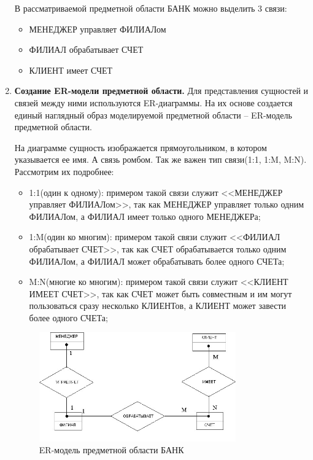 \begin{enumerate}
	В рассматриваемой предметной области БАНК можно выделить 3 связи:
	\begin{itemize}
		
		\item МЕНЕДЖЕР управляет ФИЛИАЛом
		
		\item ФИЛИАЛ обрабатывает СЧЕТ
		
		\item КЛИЕНТ имеет СЧЕТ
		
	\end{itemize}
	
	\item \textbf{Создание ER-модели предметной области.}
	Для представления сущностей и связей между ними используются ER-диаграммы. На их основе создается единый
	наглядный образ моделируемой предметной области – ER-модель предметной области.
	
	На диаграмме сущность изображается прямоугольником, в
	котором указывается ее имя. А связь ромбом. Так же важен тип связи(1:1, 1:M, M:N). Рассмотрим их подробнее:
	\begin{itemize}
		\item 1:1(один к одному): примером такой связи служит <<МЕНЕДЖЕР управляет ФИЛИАЛом>>, так как МЕНЕДЖЕР управляет только одним ФИЛИАЛом, а ФИЛИАЛ имеет только одного МЕНЕДЖЕРа;
		
		\item 1:M(один ко многим): примером такой связи служит <<ФИЛИАЛ  обрабатывает СЧЕТ>>, так как СЧЕТ обрабатывается только одним ФИЛИАЛом, а ФИЛИАЛ может обрабатывать более одного СЧЕТа;
		
		\item  M:N(многие ко многим): примером такой связи служит <<КЛИЕНТ ИМЕЕТ СЧЕТ>>, так как СЧЕТ может быть совместным и им могут пользоваться сразу несколько КЛИЕНТов, а КЛИЕНТ может завести более одного СЧЕТа;
	\end{itemize}
	\begin{figure}[H]
		\centering
		\includegraphics[width=0.8\textwidth]{assets/security/pic25.png}
		\caption{ER-модель предметной области БАНК}
		\label{fig:mesh28}
	\end{figure}
	

\end{enumerate}

